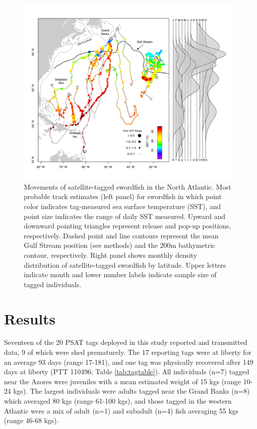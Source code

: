 \begin{figure}[htbp]
\centering
\includegraphics[width=\textwidth]{images/C4_Fig1.pdf}
\caption[Movements of satellite-tagged swordfish in the North Atlantic]{Movements of satellite-tagged swordfish in the North Atlantic. Most probable track estimates (left panel) for swordfish in which point color indicates tag-measured sea surface temperature (SST), and point size indicates the range of daily SST measured. Upward and downward pointing triangles represent release and pop-up positions, respectively. Dashed point and line contours represent the mean Gulf Stream position (see methods) and the 200m bathymetric contour, respectively. Right panel shows monthly density distribution of satellite-tagged swordfish by latitude. Upper letters indicate month and lower number labels indicate sample size of tagged individuals.}
\label{fig:c4f1}
\end{figure}

\section{Results}

Seventeen of the 20 PSAT tags deployed in this study reported and transmitted data, 9 of which were shed prematurely. The 17 reporting tags were at liberty for an average 93 days (range 17-181), and one tag was physically recovered after 149 days at liberty (PTT 110496; Table \ref{tab:tagtable}). All individuals (n=7) tagged near the Azores were juveniles with a mean estimated weight of 15 kgs (range 10-24 kgs). The largest individuals were adults tagged near the Grand Banks (n=8) which averaged 80 kgs (range 61-100 kgs), and those tagged in the western Atlantic were a mix of adult (n=1) and subadult (n=4) fish averaging 55 kgs (range 46-68 kgs).

